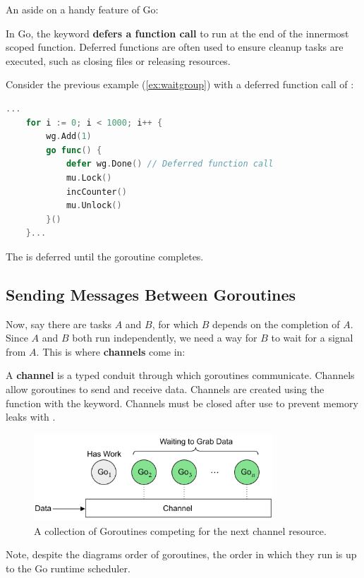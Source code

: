 \noindent
An aside on a handy feature of Go: 
\begin{Def}

    In Go, the  keyword  \textbf{defers a function call} to run at the end of the innermost scoped function. 
    Deferred functions are often used to ensure cleanup tasks are executed, such as closing files or releasing resources.
\end{Def}

\begin{Example}

    \label{ex:defer}
    Consider the previous example (\ref{ex:waitgroup}) with a deferred function call of :

    \begin{lstlisting}[language=Go, label={lst:defer}, numbers=none]
    ...
    for i := 0; i < 1000; i++ {
        wg.Add(1) 
        go func() {
            defer wg.Done() // Deferred function call
            mu.Lock() 
            incCounter()
            mu.Unlock() 
        }()
    }...
\end{lstlisting}
\noindent
The  is deferred until the goroutine completes.
\end{Example}

\subsection{Sending Messages Between Goroutines}
\noindent
Now, say there are tasks $A$ and $B$, for which $B$ depends on the completion of $A$. Since $A$ and $B$ both run independently, we need a way for $B$ to wait for a signal from $A$. This is where \textbf{channels} come in:
\begin{Def}[Channels]

    A \textbf{channel} is a typed conduit through which goroutines communicate. Channels allow goroutines to send and receive data.
    Channels are created using the  function with the  keyword. Channels must be closed after use to prevent memory leaks with .
\end{Def}

\begin{figure}[h]
    \centering
    \includegraphics[width=0.8\textwidth]{Sections/rpc/channel.png}
    \caption{A collection of Goroutines competing for the next channel resource.}
    \label{fig:channel}
\end{figure}
\noindent
Note, despite the diagrams order of goroutines, the order in which they run is up to the Go runtime scheduler.

